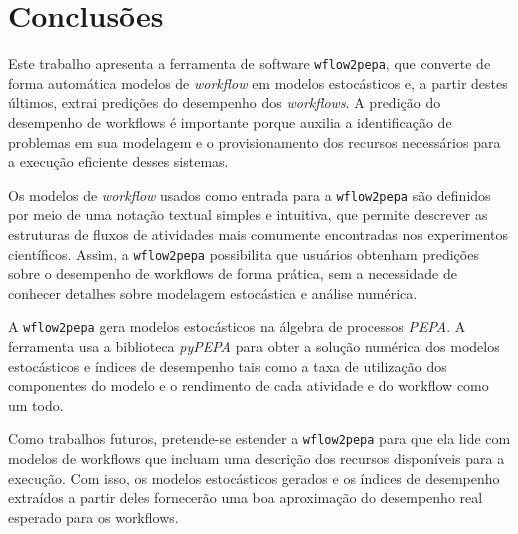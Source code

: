 \documentclass[a4paper,10pt]{article}
\begin{document}
    \newpage
    \section*{Conclusões}

	Este trabalho apresenta a ferramenta de software \texttt{wflow2pepa}, que converte de forma autom\'atica modelos de \emph{workflow} em modelos estocásticos e, a partir destes \'ultimos, extrai predições do desempenho dos \emph{workflows}. A predição do desempenho de workflows é importante porque auxilia a identificação de problemas em sua modelagem e o provisionamento dos recursos necessários para a execução eficiente desses sistemas.

    Os modelos de \emph{workflow} usados como entrada para a \texttt{wflow2pepa} são definidos por meio de uma notaç\~ao textual simples e intuitiva, que permite descrever as estruturas de fluxos de atividades mais comumente encontradas nos experimentos cient\'ificos. Assim, a \texttt{wflow2pepa} possibilita que usuários obtenham predições sobre o desempenho de workflows de forma prática, sem a necessidade de conhecer detalhes sobre modelagem estocástica e análise numérica.

    A \texttt{wflow2pepa} gera modelos estocásticos na álgebra de processos \emph{PEPA}. A ferramenta usa a biblioteca \emph{pyPEPA} para obter a solução numérica dos modelos estocásticos e índices de desempenho tais como a taxa de utilização dos componentes do modelo e o rendimento de cada atividade e do workflow como um todo.

	Como trabalhos futuros, pretende-se estender a \texttt{wflow2pepa} para que ela lide com modelos de workflows que incluam uma descrição dos recursos disponíveis para a execução. Com isso, os modelos estocásticos gerados e os índices de desempenho extraídos a partir deles fornecerão uma boa aproximação do desempenho real esperado para os workflows.


    
    
\end{document}
